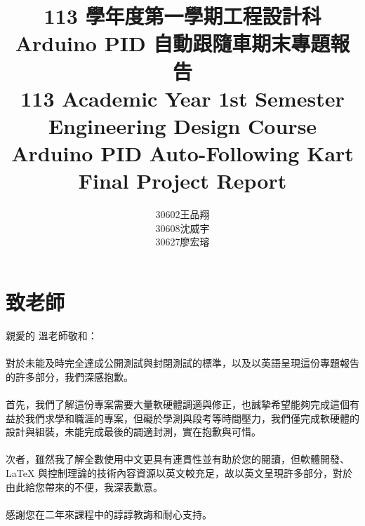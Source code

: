 \documentclass[a4paper,12pt]{article}
\begin{document}
\title{
\Large 113 學年度第一學期工程設計科\\
\huge Arduino PID 自動跟隨車期末專題報告\\
\Large 113 Academic Year 1st Semester Engineering Design Course\\
\huge Arduino PID Auto-Following Kart Final Project Report
}
\author{30602王品翔\\30608沈威宇\\30627廖宏璿}
\date{\temtoday}
\titletocdoc
\section{致老師}
親愛的 溫老師敬和：\\\\
對於未能及時完全達成公開測試與封閉測試的標準，以及以英語呈現這份專題報告的許多部分，我們深感抱歉。\\\\
首先，我們了解這份專案需要大量軟硬體調適與修正，也誠摯希望能夠完成這個有益於我們求學和職涯的專案，但礙於學測與段考等時間壓力，我們僅完成軟硬體的設計與組裝，未能完成最後的調適封測，實在抱歉與可惜。\\\\
次者，雖然我了解全數使用中文更具有連貫性並有助於您的閱讀，但軟體開發、\LaTeX{} 與控制理論的技術內容資源以英文較充足，故以英文呈現許多部分，對於由此給您帶來的不便，我深表歉意。\\\\
感謝您在二年來課程中的諄諄教誨和耐心支持。
\end{document}
